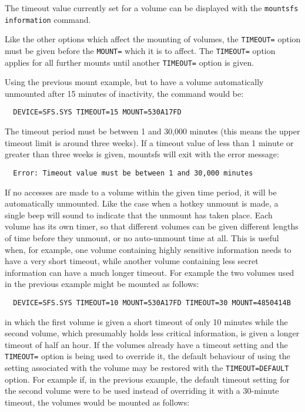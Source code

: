 The timeout value currently set for a volume can be displayed with the
{\tt mountsfs information} command.

Like the other options which affect the mounting of volumes, the {\tt TIMEOUT=} 
option must be given before the {\tt MOUNT=} which it is to affect.  The {\tt TIMEOUT=} 
option applies for all further mounts until another {\tt TIMEOUT=} option is given.

Using the previous mount example, but to have a volume automatically unmounted 
after 15 minutes of inactivity, the command would be:

{\tt \verb|  |DEVICE=SFS.SYS TIMEOUT=15 MOUNT=530A17FD}

The timeout period must be between 1 and 30,000 minutes (this means the upper
timeout limit is around three weeks).  If a timeout value of less than 1 minute
or greater than three weeks is given, mountsfs will exit with the error
message:

{\tt \verb|  |Error: Timeout value must be between 1 and 30,000 minutes}

If no accesses are made to a volume within the given time period, it will be 
automatically unmounted.  Like the case when a hotkey unmount is made, a single 
beep will sound to indicate that the unmount has taken place.  Each volume has
its own timer, so that different volumes can be given different lengths of time
before they unmount, or no auto-unmount time at all.  This is useful when, for
example, one volume containing highly sensitive information needs to have a
very short timeout, while another volume containing less secret information can
have a much longer timeout.  For example the two volumes used in the previous
example might be mounted as follows:

{\tt \verb|  |DEVICE=SFS.SYS TIMEOUT=10 MOUNT=530A17FD TIMEOUT=30 MOUNT=4850414B}

in which the first volume is given a short timeout of only 10 minutes while the
second volume, which presumably holds less critical information, is given a
longer timeout of half an hour.  If the volumes already have a timeout setting
and the {\tt TIMEOUT=} option is being used to override it, the default behaviour
of using the setting associated with the volume may be restored with the
{\tt TIMEOUT=DEFAULT} option.  For example if, in the previous example, the default 
timeout setting for the second volume were to be used instead of overriding it 
with a 30-minute timeout, the volumes would be mounted as follows:

